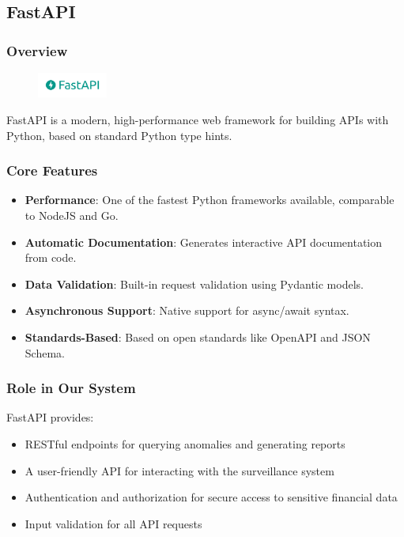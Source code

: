 \subsection{FastAPI}

\subsubsection{Overview}

\begin{figure}  %
    \vspace{-10pt} %
    \includegraphics[width=2.3cm]{figures/FastAPI_logo.png}
    \vspace{-10pt}
\end{figure}


FastAPI is a modern, high-performance web framework for building APIs with Python, based on standard Python type hints.

\subsubsection{Core Features}
\begin{itemize}
    \item \textbf{Performance}: One of the fastest Python frameworks available, comparable to NodeJS and Go.
    \item \textbf{Automatic Documentation}: Generates interactive API documentation from code.
    \item \textbf{Data Validation}: Built-in request validation using Pydantic models.
    \item \textbf{Asynchronous Support}: Native support for async/await syntax.
    \item \textbf{Standards-Based}: Based on open standards like OpenAPI and JSON Schema.
\end{itemize}

\subsubsection{Role in Our System}
FastAPI provides:
\begin{itemize}
    \item RESTful endpoints for querying anomalies and generating reports
    \item A user-friendly API for interacting with the surveillance system
    \item Authentication and authorization for secure access to sensitive financial data
    \item Input validation for all API requests
\end{itemize}



